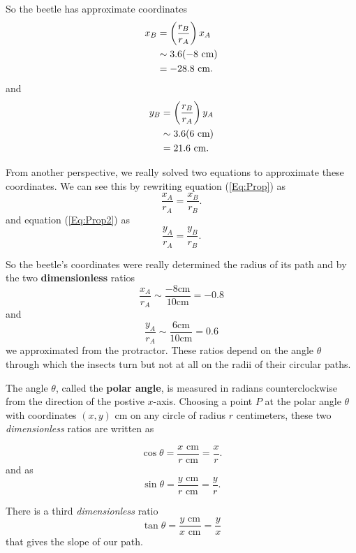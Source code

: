 \documentclass{ximera}
\begin{document}
\begin{question}
\begin{expandable}
So the beetle has approximate coordinates
\begin{align}
   x_B &= \left( \frac{r_B}{r_A}\right) x_A  \label{Eq:Prop}\\
           & \sim 3.6(-8\text{ cm})  \notag \\
           & = -28.8 \text{ cm}. \notag
\end{align}
and
\begin{align}
   y_B &= \left( \frac{r_B}{r_A}\right) y_A  \label{Eq:Prop2}\\
           & \sim 3.6(6\text{ cm})  \notag \\
           & = 21.6\text{ cm}. \notag
\end{align}

From another perspective, we really solved two equations to approximate these coordinates. We can see this by rewriting equation (\ref{Eq:Prop}) as
\[
  \frac{x_A}{r_A} = \frac{x_B}{r_B}.
\]
and equation (\ref{Eq:Prop2}) as
\[
  \frac{y_A}{r_A} = \frac{y_B}{r_B}.
\]



So the beetle's coordinates were really determined the radius of its path and by the two {\bf dimensionless} ratios
\[
    \frac{x_A}{r_A} \sim \frac{-8\text{cm}}{10\text{cm}} = -0.8
\] 
and
\[
   \frac{y_A}{r_A} \sim \frac{6\text{cm}}{10\text{cm}} = 0.6 
\]
we approximated from the protractor. These ratios depend on the angle $\theta$ through which the insects turn but not at all on the radii of their circular paths. 

The angle $\theta$, called the {\bf polar angle}, is measured in radians counterclockwise from the direction of the postive $x$-axis. Choosing a point $P$ at the polar angle $\theta$ with coordinates $(x,y)$ cm on any circle of radius $r$ centimeters, these two \emph{dimensionless} ratios are written as

\[
   \cos \theta = \frac{x \text{ cm}}{r \text{ cm}} = \frac{x}{r} .
\]
and as
\[
   \sin \theta = \frac{y \text{ cm}}{r \text{ cm}} = \frac{y}{r} .
\]

There is a third \emph{dimensionless} ratio 
\[
  \tan \theta = \frac{y \text{ cm}}{x \text{ cm}} = \frac{y}{x}
\]
that gives the slope of our path. 


\end{expandable}




\end{question}
\end{document}
